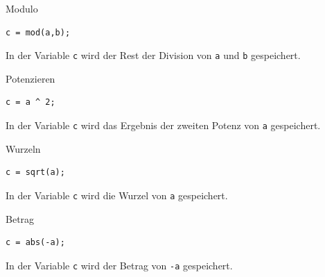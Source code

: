 \documentclass[12pt, a4paper, twoside]{article}
\begin{document}
                \begin{CodeErklaerungBox}{Modulo}
                \begin{lstlisting}
c = mod(a,b);
                \end{lstlisting}
                \tcblower
                In der Variable \texttt{c} wird der Rest der Division von \texttt{a} und \texttt{b} gespeichert.
                \end{CodeErklaerungBox}
                \begin{CodeErklaerungBox}{Potenzieren}
                \begin{lstlisting}
c = a ^ 2;
                \end{lstlisting}
                \tcblower
                In der Variable \texttt{c} wird das Ergebnis der zweiten Potenz von \texttt{a} gespeichert.
                \end{CodeErklaerungBox}
                \begin{CodeErklaerungBox}{Wurzeln}
                \begin{lstlisting}
c = sqrt(a);
                \end{lstlisting}
                \tcblower
                In der Variable \texttt{c} wird die Wurzel von \texttt{a} gespeichert.
                \end{CodeErklaerungBox}
                \begin{CodeErklaerungBox}{Betrag}
                \begin{lstlisting}
c = abs(-a);
                \end{lstlisting}
                \tcblower
                In der Variable \texttt{c} wird der Betrag von \texttt{-a} gespeichert.
                \end{CodeErklaerungBox}
\end{document}
